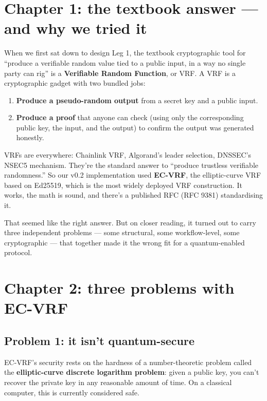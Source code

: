 \documentclass[11pt]{article}
\begin{document}
\section{Chapter 1: the textbook answer --- and why we tried it}

When we first sat down to design Leg 1, the textbook cryptographic tool for ``produce a verifiable random value tied to a public input, in a way no single party can rig'' is a \textbf{Verifiable Random Function}, or VRF. A VRF is a cryptographic gadget with two bundled jobs:

\begin{enumerate}[leftmargin=2em, itemsep=2pt]
\item \textbf{Produce a pseudo-random output} from a secret key and a public input.
\item \textbf{Produce a proof} that anyone can check (using only the corresponding public key, the input, and the output) to confirm the output was generated honestly.
\end{enumerate}

VRFs are everywhere: Chainlink VRF, Algorand's leader selection, DNSSEC's NSEC5 mechanism. They're the standard answer to ``produce trustless verifiable randomness.'' So our v0.2 implementation used \textbf{EC-VRF}, the elliptic-curve VRF based on Ed25519, which is the most widely deployed VRF construction. It works, the math is sound, and there's a published RFC (RFC 9381) standardising it.

That seemed like the right answer. But on closer reading, it turned out to carry three independent problems --- some structural, some workflow-level, some cryptographic --- that together made it the wrong fit for a quantum-enabled protocol.

\section{Chapter 2: three problems with EC-VRF}

\subsection*{Problem 1: it isn't quantum-secure}

EC-VRF's security rests on the hardness of a number-theoretic problem called the \textbf{elliptic-curve discrete logarithm problem}: given a public key, you can't recover the private key in any reasonable amount of time. On a classical computer, this is currently considered safe.
\end{document}

